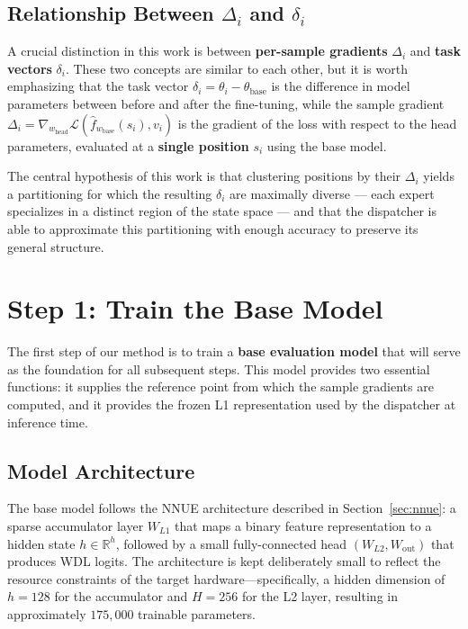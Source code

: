 \subsection{Relationship Between \texorpdfstring{\(\Delta_i\) and \(\delta_i\)}{Delta i and delta i}}\label{sec:delta-vs-task}

A crucial distinction in this work is between \textbf{per-sample gradients} \(\Delta_i\) and \textbf{task vectors} \(\delta_i\). These two concepts are similar to each other, but it is worth emphasizing that the task vector \(\delta_i = \theta_i - \theta_{\mathrm{base}}\) is the difference in model parameters between before and after the fine-tuning, while the sample gradient \(\Delta_i = \nabla_{w_{\mathrm{head}}} \mathcal{L}(\hat{f}_{w_{\mathrm{base}}}(s_i), v_i)\) is the gradient of the loss with respect to the head parameters, evaluated at a \textbf{single position} \(s_i\) using the base model.

The central hypothesis of this work is that clustering positions by their \(\Delta_i\) yields a partitioning for which the resulting \(\delta_i\) are maximally diverse --- each expert specializes in a distinct region of the state space --- and that the dispatcher is able to approximate this partitioning with enough accuracy to preserve its general structure.

\section{Step 1: Train the Base Model}\label{sec:step-base}

The first step of our method is to train a \textbf{base evaluation model} that will serve as the foundation for all subsequent steps. This model provides two essential functions: it supplies the reference point from which the sample gradients are computed, and it provides the frozen L1 representation used by the dispatcher at inference time.

\subsection{Model Architecture}\label{sec:method-arch}

The base model follows the NNUE architecture described in Section~\ref{sec:nnue}: a sparse accumulator layer \(W_{L1}\) that maps a binary feature representation to a hidden state \(h \in \mathbb{R}^h\), followed by a small fully-connected head \((W_{L2}, W_{\mathrm{out}})\) that produces WDL logits. The architecture is kept deliberately small to reflect the resource constraints of the target hardware---specifically, a hidden dimension of \(h = 128\) for the accumulator and \(H = 256\) for the L2 layer, resulting in approximately \(175{,}000\) trainable parameters.

